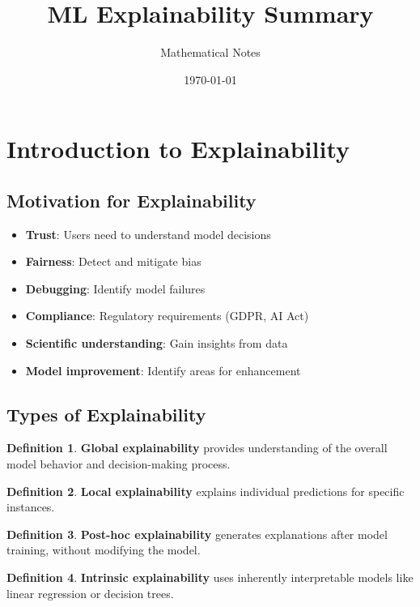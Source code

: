 \documentclass[11pt]{article}
\title{ML Explainability Summary}
\author{Mathematical Notes}
\date{\today}
\theoremstyle{definition}
\newtheorem{definition}{Definition}[section]
\begin{document}
\maketitle

\tableofcontents
\newpage

\section{Introduction to Explainability}

\subsection{Motivation for Explainability}
\begin{itemize}
    \item \textbf{Trust}: Users need to understand model decisions
    \item \textbf{Fairness}: Detect and mitigate bias
    \item \textbf{Debugging}: Identify model failures
    \item \textbf{Compliance}: Regulatory requirements (GDPR, AI Act)
    \item \textbf{Scientific understanding}: Gain insights from data
    \item \textbf{Model improvement}: Identify areas for enhancement
\end{itemize}

\subsection{Types of Explainability}
\begin{definition}
\textbf{Global explainability} provides understanding of the overall model behavior and decision-making process.
\end{definition}

\begin{definition}
\textbf{Local explainability} explains individual predictions for specific instances.
\end{definition}

\begin{definition}
\textbf{Post-hoc explainability} generates explanations after model training, without modifying the model.
\end{definition}

\begin{definition}
\textbf{Intrinsic explainability} uses inherently interpretable models like linear regression or decision trees.
\end{definition}
\end{document}
